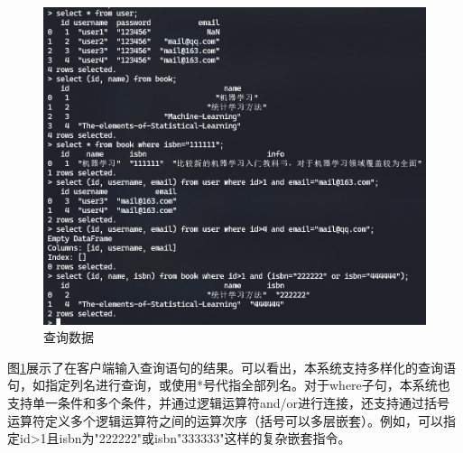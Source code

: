 \begin{figure}[H]
    \includegraphics[width=\textwidth]{examples/查询.png}
    \centering
    \caption{查询数据}
    \label{fig:select}
\end{figure}

图\ref{fig:select}展示了在客户端输入查询语句的结果。可以看出，本系统支持多样化的查询语句，如指定列名进行查询，或使用*号代指全部列名。对于where子句，本系统也支持单一条件和多个条件，并通过逻辑运算符and/or进行连接，还支持通过括号运算符定义多个逻辑运算符之间的运算次序（括号可以多层嵌套）。例如，可以指定id>1且isbn为"222222"或isbn"333333"这样的复杂嵌套指令。

